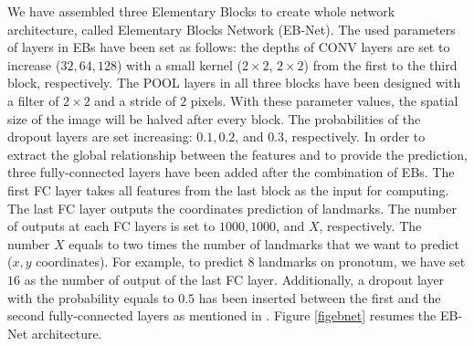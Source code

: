 \documentclass[review]{elsarticle}
\begin{document}



We have assembled three Elementary Blocks to create whole network architecture, called Elementary Blocks Network (EB-Net). The used parameters of layers in EBs have been set as follows: the depths of CONV layers are set to increase ($32, 64, 128$) with a small kernel ($2 \times 2$, $2 \times 2$) from the first to the third block, respectively. The POOL layers in all three blocks have been designed with a filter of $2 \times 2$ and a stride of $2$ pixels. With these parameter values, the spatial size of the image will be halved after every block. The probabilities of the dropout layers are set increasing: $0.1, 0.2$, and $0.3$, respectively. In order to extract the global relationship between the features and to provide the prediction, three fully-connected layers have been added after the combination of EBs. The first FC layer takes all features from the last block as the input for computing. The last FC layer outputs the coordinates prediction of landmarks. The number of outputs at each FC layers is set to $1000, 1000$, and $X$, respectively. The number $X$ equals to two times the number of landmarks that we want to predict ($x, y$ coordinates). For example, to predict $8$ landmarks on pronotum, we have set $16$ as the number of output of the last FC layer. Additionally, a dropout layer with the probability equals to $0.5$ has been inserted between the first and the second fully-connected layers as mentioned in \cite{hinton2012improving}. Figure \ref{figebnet} resumes the EB-Net architecture.
\end{document}
